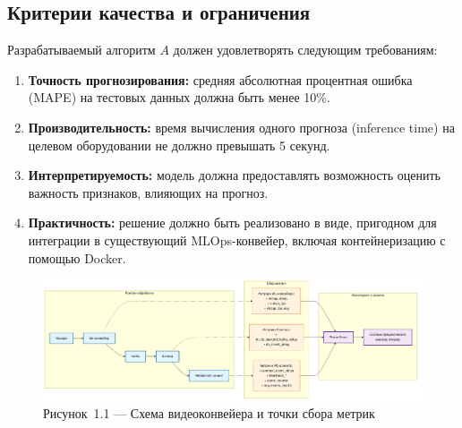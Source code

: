 \subsection*{Критерии качества и ограничения}
\hspace*{1.25cm}Разрабатываемый алгоритм $A$ должен удовлетворять следующим требованиям:
\begin{enumerate}
	\item \textbf{Точность прогнозирования:} средняя абсолютная процентная ошибка (MAPE) на тестовых данных должна быть менее 10\%.
	\item \textbf{Производительность:} время вычисления одного прогноза (inference time) на целевом оборудовании не должно превышать 5 секунд.
	\item \textbf{Интерпретируемость:} модель должна предоставлять возможность оценить важность признаков, влияющих на прогноз.
	\item \textbf{Практичность:} решение должно быть реализовано в виде, пригодном для интеграции в существующий MLOps-конвейер, включая контейнеризацию с помощью Docker.
\end{enumerate}

\begin{landscape}
\vspace*{\fill}
\begin{figure}[H]
	\centering
	\includegraphics[width=\linewidth,height=\textheight,keepaspectratio]{figures/chapter1/video_pipeline_diagram.png}
	\caption*{Рисунок~1.1 --- Схема видеоконвейера и точки сбора метрик}
	\label{fig:video_pipeline}
\end{figure}
\vspace*{\fill}
\end{landscape}
